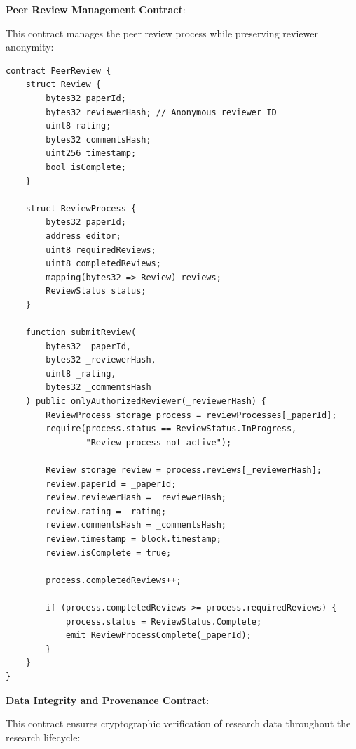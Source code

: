 \documentclass[10pt,twocolumn]{article}
\begin{document}
\textbf{Peer Review Management Contract}:

This contract manages the peer review process while preserving reviewer anonymity:

\begin{verbatim}
contract PeerReview {
    struct Review {
        bytes32 paperId;
        bytes32 reviewerHash; // Anonymous reviewer ID
        uint8 rating;
        bytes32 commentsHash;
        uint256 timestamp;
        bool isComplete;
    }
    
    struct ReviewProcess {
        bytes32 paperId;
        address editor;
        uint8 requiredReviews;
        uint8 completedReviews;
        mapping(bytes32 => Review) reviews;
        ReviewStatus status;
    }
    
    function submitReview(
        bytes32 _paperId,
        bytes32 _reviewerHash,
        uint8 _rating,
        bytes32 _commentsHash
    ) public onlyAuthorizedReviewer(_reviewerHash) {
        ReviewProcess storage process = reviewProcesses[_paperId];
        require(process.status == ReviewStatus.InProgress, 
                "Review process not active");
        
        Review storage review = process.reviews[_reviewerHash];
        review.paperId = _paperId;
        review.reviewerHash = _reviewerHash;
        review.rating = _rating;
        review.commentsHash = _commentsHash;
        review.timestamp = block.timestamp;
        review.isComplete = true;
        
        process.completedReviews++;
        
        if (process.completedReviews >= process.requiredReviews) {
            process.status = ReviewStatus.Complete;
            emit ReviewProcessComplete(_paperId);
        }
    }
}
\end{verbatim}

\textbf{Data Integrity and Provenance Contract}:

This contract ensures cryptographic verification of research data throughout the research lifecycle:
\end{document}
